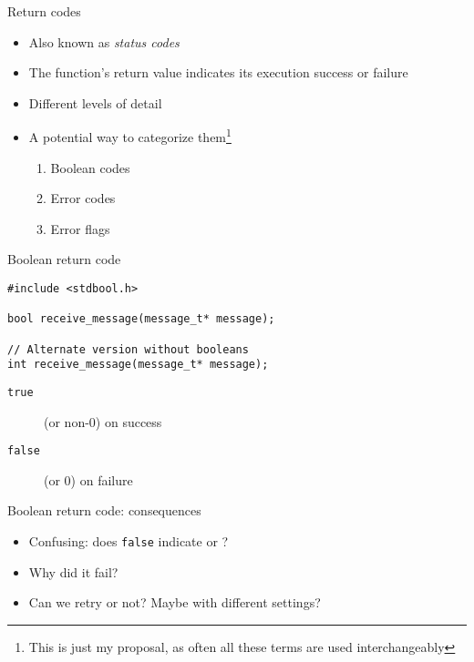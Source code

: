 \documentclass[aspectratio=169,14pt]{beamer}
\begin{document}
\begin{frame}{Return codes}
\begin{itemize}
    \item Also known as \textit{status codes}
    \item The function's return value indicates its execution success or failure
    \item Different levels of detail
    \item A potential way to categorize them\footnote{This is just my proposal, as often all these terms are used interchangeably}\\
    \begin{enumerate}
        \item Boolean codes
        \item Error codes
        \item Error flags
    \end{enumerate}
\end{itemize}
\end{frame}



\begin{frame}[fragile]{Boolean return code}
\begin{lstlisting}[style=cstyle]
#include <stdbool.h>

bool receive_message(message_t* message);

// Alternate version without booleans
int receive_message(message_t* message);
\end{lstlisting}

\begin{description}
    \item[\texttt{true}] (or non-0) on success
    \item[\texttt{false}] (or 0) on failure
\end{description}
\end{frame}



\begin{frame}[fragile]{Boolean return code: consequences}
\begin{itemize}
    \item[\bad] Confusing: does \texttt{false} indicate  or ?
    \item[\bad] Why did it fail?
    \item[\bad] Can we retry or not? Maybe with different settings?
\end{itemize}
\end{frame}
\end{document}

